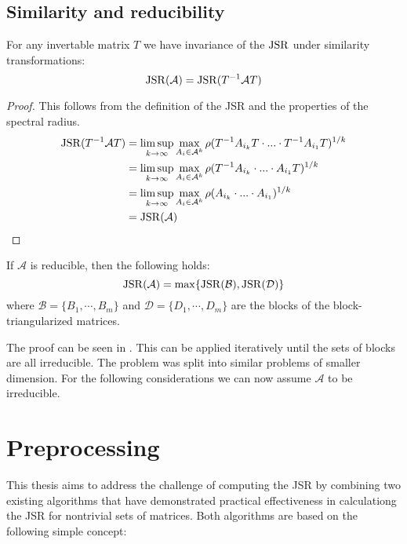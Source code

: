 \subsection*{Similarity and reducibility}
\begin{proposition}
    For any invertable matrix $T$ we have invariance of the $\operatorname{JSR}$ under similarity transformations:
    \begin{equation}
       \operatorname{JSR}(\mathcal{A}) = \operatorname{JSR}(T^{-1}\mathcal{A}T) 
    \end{equation}
\end{proposition}

\begin{proof}
    This follows from the definition of the JSR and the properties of the spectral radius.
    \begin{align*}
    \operatorname{JSR}(T^{-1}\mathcal{A}T) & = \limsup_{k \to \infty} \max_{A_i \in \mathcal{A}^k} \rho(T^{-1}A_{i_k}T \cdot ... \cdot T^{-1}A_{i_1}T)^{1/k}\\
    & = \limsup_{k \to \infty} \max_{A_i \in \mathcal{A}^k} \rho(T^{-1}A_{i_k} \cdot ... \cdot A_{i_1}T)^{1/k}\\
    & = \limsup_{k \to \infty} \max_{A_i \in \mathcal{A}^k} \rho(A_{i_k} \cdot ... \cdot A_{i_1})^{1/k}\\
    & = \operatorname{JSR}(\mathcal{A}) \\
    \end{align*}
\end{proof}

\begin{proposition}
    If $\mathcal{A}$ is reducible, then the following holds:
    \begin{equation}
        \operatorname{JSR}(\mathcal{A}) = \max \{\operatorname{JSR}(\mathcal{B}), \operatorname{JSR}(\mathcal{D})\}
    \end{equation}
    where $\mathcal{B} = \{B_1,\cdots, B_m\}$ and $\mathcal{D}= \{D_1,\cdots, D_m\}$ are the blocks of the block-triangularized matrices.
\end{proposition}
 
The proof can be seen in \citep{jungersJointSpectralRadius2009}.
This can be applied iteratively until the sets of blocks are all irreducible.
The problem was split into similar problems of smaller dimension.
For the following considerations we can now assume $\mathcal{A}$ to be irreducible.

\section{Preprocessing}
\label{sec:preprocessing}
This thesis aims to address the challenge of computing the JSR by combining two existing algorithms that have demonstrated practical effectiveness in calculationg the JSR for nontrivial sets of matrices. Both algorithms are based on the following simple concept:


